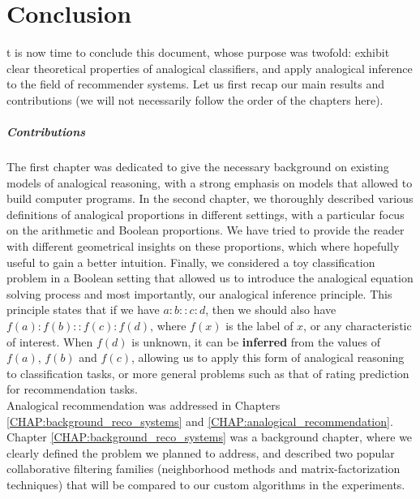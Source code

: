 \chapter*{Conclusion}

t is now time to conclude this document, whose purpose was twofold:
exhibit clear theoretical properties of analogical classifiers, and apply
analogical inference to the field of recommender systems. Let us first recap
our main results and contributions (we will not necessarily follow the order of
the chapters here).

\paragraph{Contributions\\}

The first chapter was dedicated to give the necessary background on existing
models of analogical reasoning,  with a strong emphasis on models that allowed
to build computer programs. In the second chapter, we thoroughly described
various definitions of analogical proportions in different settings, with a
particular focus on the arithmetic and Boolean proportions. We have tried to
provide the reader with different geometrical insights on these proportions,
which where hopefully useful to gain a better intuition.
Finally, we considered a toy classification problem in a Boolean setting that
allowed us to introduce the analogical equation solving process and most
importantly, our analogical inference principle. This principle states that if
we have $a:b::c:d$, then we should also have $f(a) : f(b) :: f(c):f(d)$, where
$f(x)$ is the label of $x$, or any characteristic of interest.  When $f(d)$ is
unknown, it can be \textbf{inferred} from the values of $f(a)$, $f(b)$ and
$f(c)$, allowing us to apply this form of analogical reasoning to
classification tasks, or more general problems such as that of rating
prediction for recommendation tasks.\\

Analogical recommendation was addressed in Chapters
\ref{CHAP:background_reco_systems} and \ref{CHAP:analogical_recommendation}.
Chapter \ref{CHAP:background_reco_systems} was a background chapter, where we
clearly defined the problem we planned to address, and described two popular
collaborative filtering families (neighborhood methods and
matrix-factorization techniques) that will be compared to our custom algorithms
in the experiments.

